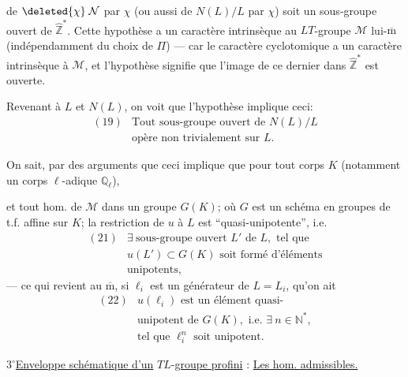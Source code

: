 de $\deleted{\chi}\;\mathcal{N}$ par $\chi$ (ou aussi de $N(L)/L$ par $\chi$) soit un sous-groupe ouvert de $\widehat{\mathbb{Z}}^{*}$. Cette hypothèse a un caractère intrinsèque au $LT$-groupe $\mathcal{M}$ lui-$\overline{\mathrm m}$ (indépendamment du choix de $\Pi$) --- car le caractère cyclotomique
a un caractère intrinsèque à $\mathcal{M}$, et l'hypothèse signifie que l'image de ce dernier dans $\widehat{\mathbb{Z}}^{*}$ est ouverte.

Revenant à $L$ et $N(L)$, on voit que l'hypothèse  implique ceci:
\[
\begin{array}{ll}
(19)&\text{Tout sous-groupe ouvert de }N(L)/L\\
&\text{opère non trivialement sur }L.
\end{array}
\]

On sait, par des arguments  que ceci implique que pour tout  corps $K$  (notamment un corps $\ell$-adique $\mathbb{Q}_{\ell}$),

et tout hom. de $\mathcal{M}$ dans un groupe $G(K)$; où $G$ est un schéma en groupes de t.f. affine sur $K$; 
la restriction de $u$ à $L$ est ``quasi-unipotente'', i.e.
\[
\begin{array}{ll}
(21)&\exists\ \text{sous-groupe ouvert }L'\text{ de }L,\text{ tel que}\\
&u(L')\subset G(K)\text{ soit formé d'éléments}\\
&\text{unipotents},
\end{array}
\]
--- ce qui revient au $\overline{\mathrm m}$, si $\ell_i$ est un générateur de $L=L_i$, qu'on ait
\[
\begin{array}{ll}
(22)&u(\ell_i)\text{ est un élément quasi-}\\
&\text{unipotent de }G(K),\text{ i.e. }\exists\ n\in\mathbb{N}^{*},\\
&\text{tel que }\ell_i^{n}\text{ soit unipotent}.
\end{array}
\]

\textcircled{\(3^\circ\)}\quad \uline{Enveloppe schématique d'un} \(T\)\unsure{-}\(L\)-\uline{groupe profini} :  \uline{Les hom. admissibles.}

